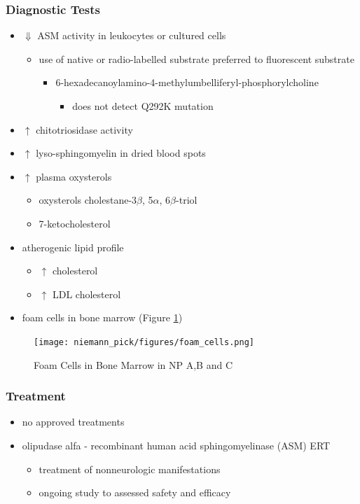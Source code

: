 \documentclass[12pt]{scrartcl}
\begin{document}
\subsubsection{Diagnostic Tests}
\label{sec:org24b2c33}
\begin{itemize}
\item \(\Downarrow\) ASM activity in leukocytes or cultured cells
\begin{itemize}
\item use of native or radio-labelled substrate preferred to fluorescent substrate
\begin{itemize}
\item 6-hexadecanoylamino-4-methylumbelliferyl-phosphorylcholine
\begin{itemize}
\item does not detect Q292K mutation
\end{itemize}
\end{itemize}
\end{itemize}
\item \(\uparrow\) chitotriosidase activity
\item \(\uparrow\) lyso-sphingomyelin in dried blood spots
\item \(\uparrow\) plasma oxysterols
\begin{itemize}
\item oxysterols cholestane-3\(\beta\), 5\(\alpha\), 6\(\beta\)-triol
\item 7-ketocholesterol
\end{itemize}
\item atherogenic lipid profile 
\begin{itemize}
\item \(\uparrow\) cholesterol
\item \(\uparrow\) LDL cholesterol
\end{itemize}
\item foam cells in bone marrow (Figure \ref{fig:org21af591})
\end{itemize}

\begin{figure}[htbp]
\centering
\texttt{[image: niemann\_pick/figures/foam\_cells.png]}
\caption{\label{fig:org21af591}Foam Cells in Bone Marrow in NP A,B and C}
\end{figure}

\subsubsection{Treatment}
\label{sec:orgd0d3fff}
\begin{itemize}
\item no approved treatments
\item olipudase alfa - recombinant human acid sphingomyelinase (ASM) ERT
\begin{itemize}
\item treatment of nonneurologic manifestations
\item ongoing study to assessed safety and efficacy
\end{itemize}
\end{itemize}
\end{document}
